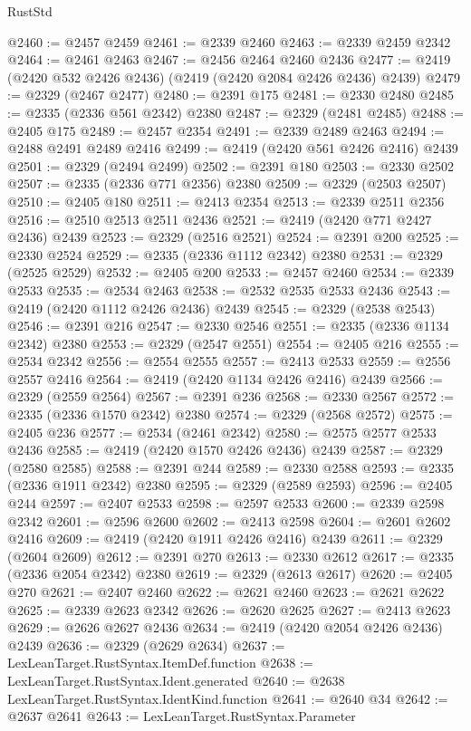 \begin{lexlean}{RustStd}
\begin{coremodule}
@2460 := @2457 @2459
@2461 := @2339 @2460
@2463 := @2339 @2459 @2342
@2464 := @2461 @2463
@2467 := @2456 @2464 @2460 @2436
@2477 := @2419 (@2420 @532 @2426 @2436) (@2419 (@2420 @2084 @2426 @2436) @2439)
@2479 := @2329 (@2467 @2477)
@2480 := @2391 @175
@2481 := @2330 @2480
@2485 := @2335 (@2336 @561 @2342) @2380
@2487 := @2329 (@2481 @2485)
@2488 := @2405 @175
@2489 := @2457 @2354
@2491 := @2339 @2489 @2463
@2494 := @2488 @2491 @2489 @2416
@2499 := @2419 (@2420 @561 @2426 @2416) @2439
@2501 := @2329 (@2494 @2499)
@2502 := @2391 @180
@2503 := @2330 @2502
@2507 := @2335 (@2336 @771 @2356) @2380
@2509 := @2329 (@2503 @2507)
@2510 := @2405 @180
@2511 := @2413 @2354
@2513 := @2339 @2511 @2356
@2516 := @2510 @2513 @2511 @2436
@2521 := @2419 (@2420 @771 @2427 @2436) @2439
@2523 := @2329 (@2516 @2521)
@2524 := @2391 @200
@2525 := @2330 @2524
@2529 := @2335 (@2336 @1112 @2342) @2380
@2531 := @2329 (@2525 @2529)
@2532 := @2405 @200
@2533 := @2457 @2460
@2534 := @2339 @2533
@2535 := @2534 @2463
@2538 := @2532 @2535 @2533 @2436
@2543 := @2419 (@2420 @1112 @2426 @2436) @2439
@2545 := @2329 (@2538 @2543)
@2546 := @2391 @216
@2547 := @2330 @2546
@2551 := @2335 (@2336 @1134 @2342) @2380
@2553 := @2329 (@2547 @2551)
@2554 := @2405 @216
@2555 := @2534 @2342
@2556 := @2554 @2555
@2557 := @2413 @2533
@2559 := @2556 @2557 @2416
@2564 := @2419 (@2420 @1134 @2426 @2416) @2439
@2566 := @2329 (@2559 @2564)
@2567 := @2391 @236
@2568 := @2330 @2567
@2572 := @2335 (@2336 @1570 @2342) @2380
@2574 := @2329 (@2568 @2572)
@2575 := @2405 @236
@2577 := @2534 (@2461 @2342)
@2580 := @2575 @2577 @2533 @2436
@2585 := @2419 (@2420 @1570 @2426 @2436) @2439
@2587 := @2329 (@2580 @2585)
@2588 := @2391 @244
@2589 := @2330 @2588
@2593 := @2335 (@2336 @1911 @2342) @2380
@2595 := @2329 (@2589 @2593)
@2596 := @2405 @244
@2597 := @2407 @2533
@2598 := @2597 @2533
@2600 := @2339 @2598 @2342
@2601 := @2596 @2600
@2602 := @2413 @2598
@2604 := @2601 @2602 @2416
@2609 := @2419 (@2420 @1911 @2426 @2416) @2439
@2611 := @2329 (@2604 @2609)
@2612 := @2391 @270
@2613 := @2330 @2612
@2617 := @2335 (@2336 @2054 @2342) @2380
@2619 := @2329 (@2613 @2617)
@2620 := @2405 @270
@2621 := @2407 @2460
@2622 := @2621 @2460
@2623 := @2621 @2622
@2625 := @2339 @2623 @2342
@2626 := @2620 @2625
@2627 := @2413 @2623
@2629 := @2626 @2627 @2436
@2634 := @2419 (@2420 @2054 @2426 @2436) @2439
@2636 := @2329 (@2629 @2634)
@2637 := LexLeanTarget.RustSyntax.ItemDef.function
@2638 := LexLeanTarget.RustSyntax.Ident.generated
@2640 := @2638 LexLeanTarget.RustSyntax.IdentKind.function
@2641 := @2640 @34
@2642 := @2637 @2641
@2643 := LexLeanTarget.RustSyntax.Parameter

\end{coremodule}
\end{lexlean}
